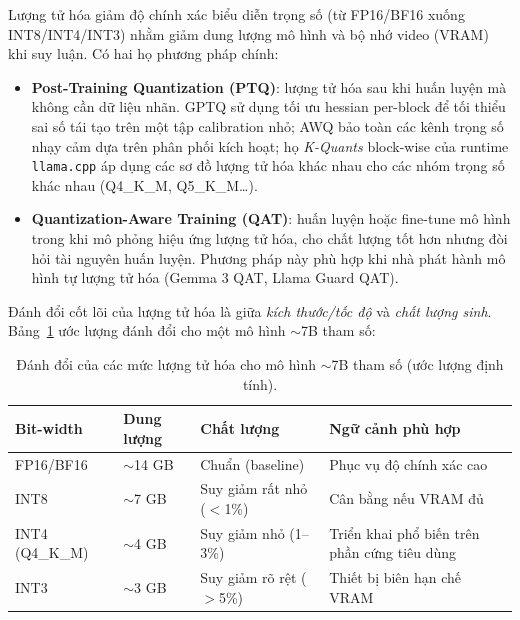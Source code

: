 Lượng tử hóa giảm độ chính xác biểu diễn trọng số (từ FP16/BF16 xuống INT8/INT4/INT3) nhằm giảm dung lượng mô hình và bộ nhớ video (VRAM) khi suy luận. Có hai họ phương pháp chính:

\begin{itemize}
  \item \textbf{Post-Training Quantization (PTQ)}: lượng tử hóa sau khi huấn luyện mà không cần dữ liệu nhãn. GPTQ \cite{frantar2022gptq} sử dụng tối ưu hessian per-block để tối thiểu sai số tái tạo trên một tập calibration nhỏ; AWQ \cite{lin_awq_2024} bảo toàn các kênh trọng số nhạy cảm dựa trên phân phối kích hoạt; họ \textit{K-Quants} block-wise của runtime \texttt{llama.cpp} \cite{llamacpp_kquants} áp dụng các sơ đồ lượng tử hóa khác nhau cho các nhóm trọng số khác nhau (Q4\_K\_M, Q5\_K\_M\dots).
  \item \textbf{Quantization-Aware Training (QAT)}: huấn luyện hoặc fine-tune mô hình trong khi mô phỏng hiệu ứng lượng tử hóa, cho chất lượng tốt hơn nhưng đòi hỏi tài nguyên huấn luyện. Phương pháp này phù hợp khi nhà phát hành mô hình tự lượng tử hóa (Gemma 3 QAT, Llama Guard QAT).
\end{itemize}

Đánh đổi cốt lõi của lượng tử hóa là giữa \textit{kích thước/tốc độ} và \textit{chất lượng sinh}. Bảng~\ref{tab:quantization-tradeoff} ước lượng đánh đổi cho một mô hình $\sim$7B tham số:

\begin{table}[!htb]
\centering
\caption{Đánh đổi của các mức lượng tử hóa cho mô hình $\sim$7B tham số (ước lượng định tính).}
\label{tab:quantization-tradeoff}
\small
\begin{tabularx}{\textwidth}{l l l X}
\toprule
\textbf{Bit-width} & \textbf{Dung lượng} & \textbf{Chất lượng} & \textbf{Ngữ cảnh phù hợp} \\
\midrule
FP16/BF16  & $\sim$14 GB  & Chuẩn (baseline)               & Phục vụ độ chính xác cao \\
INT8       & $\sim$7 GB   & Suy giảm rất nhỏ ($<$1\%)      & Cân bằng nếu VRAM đủ \\
INT4 (Q4\_K\_M) & $\sim$4 GB & Suy giảm nhỏ (1--3\%)        & Triển khai phổ biến trên phần cứng tiêu dùng \\
INT3       & $\sim$3 GB   & Suy giảm rõ rệt ($>$5\%)       & Thiết bị biên hạn chế VRAM \\
\bottomrule
\end{tabularx}
\end{table}

